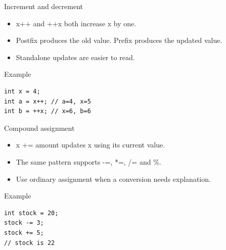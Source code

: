 \documentclass[10pt,aspectratio=169]{beamer}
\begin{document}
\begin{frame}[fragile,t]{Increment and decrement}
\begin{itemize}
\item x++ and ++x both increase x by one.
\item Postfix produces the old value. Prefix produces the updated value.
\item Standalone updates are easier to read.
\end{itemize}
\vspace{1mm}\begin{block}{Example}
\begin{lstlisting}
int x = 4;
int a = x++; // a=4, x=5
int b = ++x; // x=6, b=6
\end{lstlisting}
\end{block}
\end{frame}

\begin{frame}[fragile,t]{Compound assignment}
\begin{itemize}
\item x += amount updates x using its current value.
\item The same pattern supports -=, *=, /= and \%.
\item Use ordinary assignment when a conversion needs explanation.
\end{itemize}
\vspace{1mm}\begin{block}{Example}
\begin{lstlisting}
int stock = 20;
stock -= 3;
stock += 5;
// stock is 22
\end{lstlisting}
\end{block}
\end{frame}
\end{document}
